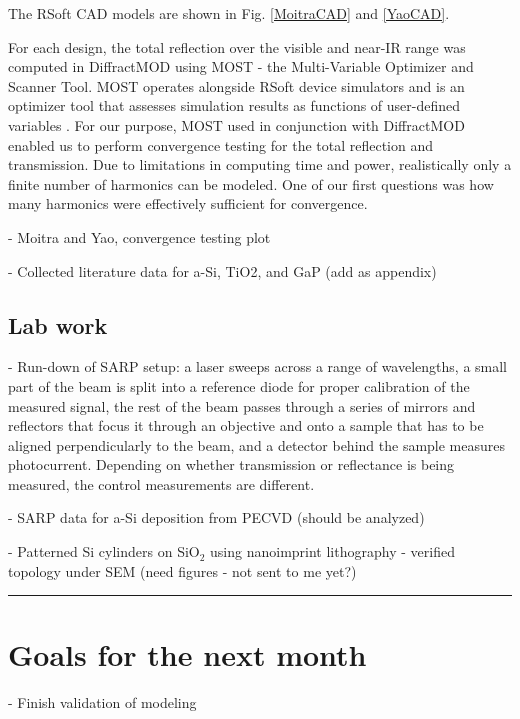 \documentclass{article}
\begin{document}
The RSoft CAD models are shown in Fig. \ref{MoitraCAD} and \ref{YaoCAD}. 

For each design, the total reflection over the visible and near-IR range was computed in DiffractMOD using MOST - the Multi-Variable Optimizer and Scanner Tool. MOST operates alongside RSoft device simulators and is an optimizer tool that assesses simulation results as functions of user-defined variables \cite{MOST}. For our purpose, MOST used in conjunction with DiffractMOD enabled us to perform convergence testing for the total  reflection and transmission. Due to limitations in computing time and power, realistically only a finite number of harmonics can be modeled. One of our first questions was how many harmonics were effectively sufficient for convergence. 


- Moitra and Yao, convergence testing plot

- Collected literature data for a-Si, TiO2, and GaP (add as appendix)

\subsection*{Lab work}
- Run-down of SARP setup: a laser sweeps across a range of wavelengths, a small part of the beam is split into a reference diode for proper calibration of the measured signal, the rest of the beam passes through a series of mirrors and reflectors that focus it through an objective and onto a sample that has to be aligned perpendicularly to the beam, and a detector behind the sample measures photocurrent. Depending on whether transmission or reflectance is being measured, the control measurements are different.  

- SARP data for a-Si deposition from PECVD (should be analyzed)

- Patterned Si cylinders on SiO$_2$ using nanoimprint lithography - verified topology under SEM (need figures - not sent to me yet?)

\begin{center}
\rule{450pt}{1pt}
\end{center}
\section*{Goals for the next month}
- Finish validation of modeling
\end{document}
